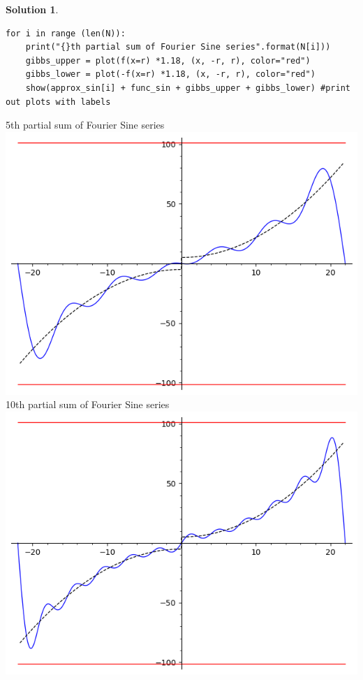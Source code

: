 \documentclass[10pt]{article}
\makeatletter
\theoremstyle{definition}
\newtheorem{soln}{Solution}
\newcommand{\boxspacing}{\kern\kvtcb@left@rule\kern\kvtcb@boxsep}
\newcommand{\prompt}[4]{
    \ttfamily\llap{{\color{#2}[#3]:\hspace{3pt}#4}}\vspace{-\baselineskip}
}
\makeatother
\begin{document}
\begin{soln}
\begin{enumerate}[label=(\alph*)]
\begin{tcolorbox}[breakable, size=fbox, boxrule=1pt, pad at break*=1mm,colback=cellbackground, colframe=cellborder]
\begin{verbatim}
for i in range (len(N)):
    print("{}th partial sum of Fourier Sine series".format(N[i]))
    gibbs_upper = plot(f(x=r) *1.18, (x, -r, r), color="red") 
    gibbs_lower = plot(-f(x=r) *1.18, (x, -r, r), color="red")
    show(approx_sin[i] + func_sin + gibbs_upper + gibbs_lower) #print out plots with labels
              \end{verbatim}
          \end{tcolorbox}
          \begin{tcolorbox}[breakable, size=fbox, boxrule=.5pt, pad at break*=1mm, opacityfill=0]
            \prompt{Out}{outcolor}{1}{\boxspacing}
            5th partial sum of Fourier Sine series\\
            \includegraphics[scale=0.75]{graphs/g1s.png}\\
            10th partial sum of Fourier Sine series\\
            \includegraphics[scale=0.75]{graphs/g2s.png}\\

\end{tcolorbox}
\end{enumerate}
\end{soln}
\end{document}
